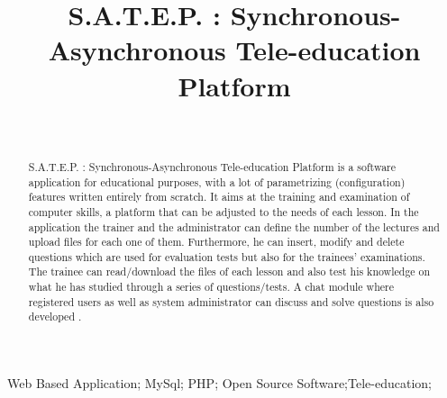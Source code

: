 \documentclass[10pt, conference, compsocconf]{IEEEtran}
\begin{document}
\title{S.A.T.E.P. : Synchronous-Asynchronous Tele-education Platform}




\author
{
\\

}

 

\maketitle


\begin{abstract}
   S.A.T.E.P. : Synchronous-Asynchronous Tele-education Platform is a  software application for educational purposes, with a lot of parametrizing (configuration) features written entirely from scratch. It aims at the training and examination of  computer skills, a platform that can be adjusted to the needs of each lesson. In the application the trainer and the administrator can define the number of the lectures and upload files for each one of them. Furthermore, he can insert, modify and delete questions which are used for evaluation tests but also for the trainees’ examinations.  The trainee can read/download the files of each lesson and also test his knowledge on what he has studied through a series of questions/tests. A chat module where registered users as well as  system administrator can discuss and solve questions is also developed .


 
\end{abstract}

\begin{IEEEkeywords}
Web Based Application; MySql; PHP; Open Source Software;Tele-education;  
\end{IEEEkeywords}


\IEEEpeerreviewmaketitle
\end{document}
